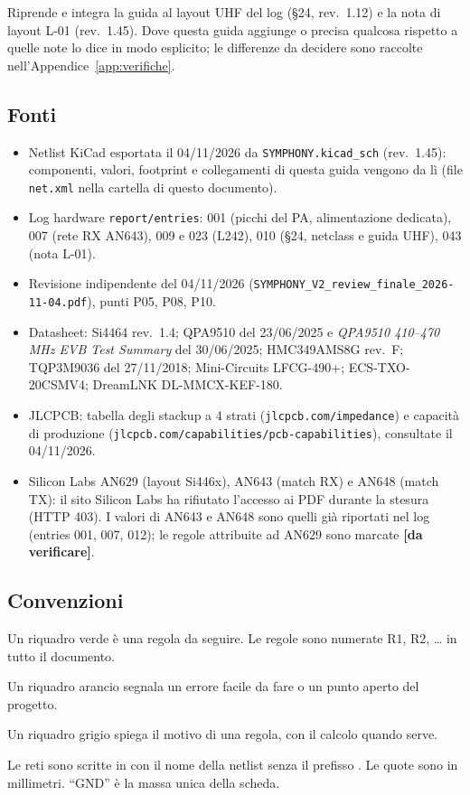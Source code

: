 \documentclass[a4paper,10pt]{article}
\newcommand{\net}[1]{\texttt{\detokenize{#1}}}
\newcommand{\dv}{\textcolor{verfr}{\textbf{[da verificare]}}}
\newcounter{regola}
\begin{document}
Riprende e integra la guida al layout UHF del log (\S24, rev.~1.12) e la nota di layout L-01
(rev.~1.45). Dove questa guida aggiunge o precisa qualcosa rispetto a quelle note lo dice in modo
esplicito; le differenze da decidere sono raccolte nell'Appendice~\ref{app:verifiche}.

\subsection{Fonti}
\begin{itemize}
\item Netlist KiCad esportata il 04/11/2026 da \texttt{SYMPHONY.kicad\_sch} (rev.~1.45): componenti,
      valori, footprint e collegamenti di questa guida vengono da lì (file \texttt{net.xml} nella cartella
      di questo documento).
\item Log hardware \texttt{report/entries}: 001 (picchi del PA, alimentazione dedicata), 007 (rete RX
      AN643), 009 e 023 (L242), 010 (\S24, netclass e guida UHF), 043 (nota L-01).
\item Revisione indipendente del 04/11/2026 (\texttt{SYMPHONY\_V2\_review\_finale\_2026-11-04.pdf}), punti P05, P08, P10.
\item Datasheet: Si4464 rev.~1.4; QPA9510 del 23/06/2025 e \emph{QPA9510 410--470\,MHz EVB Test
      Summary} del 30/06/2025; HMC349AMS8G rev.~F; TQP3M9036 del 27/11/2018; Mini-Circuits LFCG-490+;
      ECS-TXO-20CSMV4; DreamLNK DL-MMCX-KEF-180.
\item JLCPCB: tabella degli stackup a 4 strati (\nolinkurl{jlcpcb.com/impedance}) e capacità di
      produzione (\nolinkurl{jlcpcb.com/capabilities/pcb-capabilities}), consultate il 04/11/2026.
\item Silicon Labs AN629 (layout Si446x), AN643 (match RX) e AN648 (match TX): il sito Silicon Labs ha
      rifiutato l'accesso ai PDF durante la stesura (HTTP 403). I valori di AN643 e AN648 sono quelli già
      riportati nel log (entries 001, 007, 012); le regole attribuite ad AN629 sono marcate \dv.
\end{itemize}

\subsection{Convenzioni}
\begin{regola}[esempio]
Un riquadro verde è una regola da seguire. Le regole sono numerate R1, R2, \ldots{} in tutto il documento.
\end{regola}
\addtocounter{regola}{-1}
\begin{attenzione}
Un riquadro arancio segnala un errore facile da fare o un punto aperto del progetto.
\end{attenzione}
\begin{perche}
Un riquadro grigio spiega il motivo di una regola, con il calcolo quando serve.
\end{perche}
Le reti sono scritte in \net{carattere_macchina} con il nome della netlist senza il prefisso
\net{/UHF/}. Le quote sono in millimetri. \enquote{GND} è la massa unica della scheda.
\end{document}
